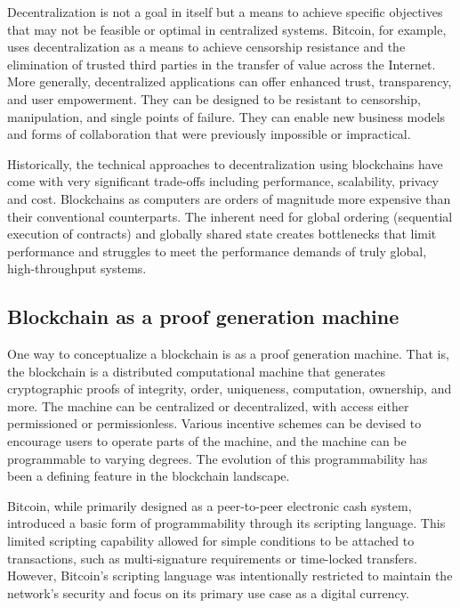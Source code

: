 \documentclass{article}
\begin{document}
Decentralization is not a goal in itself but a means to achieve specific objectives that may not be feasible or optimal in centralized systems. Bitcoin, for example, uses decentralization as a means to achieve censorship resistance and the elimination of trusted third parties in the transfer of value across the Internet. More generally, decentralized applications can offer enhanced trust, transparency, and user empowerment. They can be designed to be resistant to censorship, manipulation, and single points of failure. They can enable new business models and forms of collaboration that were previously impossible or impractical.

Historically, the technical approaches to decentralization using blockchains have come with very significant trade-offs including performance, scalability, privacy and cost. Blockchains as computers are orders of magnitude more expensive than their conventional counterparts. The inherent need for global ordering (sequential execution of contracts) and globally shared state creates bottlenecks that limit performance and struggles to meet the performance demands of truly global, high-throughput systems.

\subsection*{Blockchain as a proof generation machine}

One way to conceptualize a blockchain is as a proof generation machine. That is, the blockchain is a distributed computational machine that generates cryptographic proofs of integrity, order, uniqueness, computation, ownership, and more. The machine can be centralized or decentralized, with access either permissioned or permissionless. Various incentive schemes can be devised to encourage users to operate parts of the machine, and the machine can be programmable to varying degrees. The evolution of this programmability has been a defining feature in the blockchain landscape.

Bitcoin, while primarily designed as a peer-to-peer electronic cash system, introduced a basic form of programmability through its scripting language. This limited scripting capability allowed for simple conditions to be attached to transactions, such as multi-signature requirements or time-locked transfers. However, Bitcoin's scripting language was intentionally restricted to maintain the network's security and focus on its primary use case as a digital currency.
\end{document}

